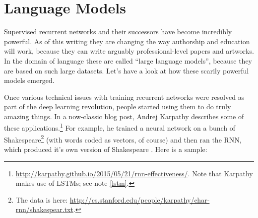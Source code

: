 
\section{Language Models}


Supervised recurrent networks and their successors have become incredibly powerful. As of this writing they are changing the way authorship and education will work, because they can write arguably professional-level papers and artworks.  In the domain of language these are called ``large language models'', because they are based on such large datasets.  Let's have a look at how these scarily powerful models emerged.

Once various technical issues with training recurrent networks were resolved as part of the deep learning revolution, people started using them to do truly amazing things. In a now-classic blog post, Andrej Karpathy describes some of these applications.\footnote{\url{http://karpathy.github.io/2015/05/21/rnn-effectiveness/}. Note that Karpathy makes use of LSTMs; see note \ref{lstm}.}  For example, he trained a neural network on a bunch of Shakespeare\footnote{The data is here: \url{http://cs.stanford.edu/people/karpathy/char-rnn/shakespear.txt}.}  (with words coded as vectors, of course) and then ran the RNN, which produced it's own version of Shakespeare \cite{karpathy2015unreasonable}. Here is a sample:

